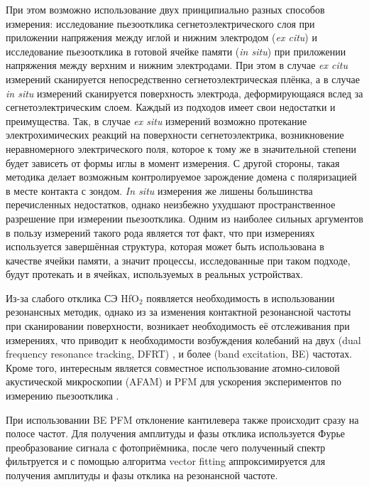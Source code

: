 При этом возможно использование двух принципиально разных способов измерения: исследование пьезоотклика сегнетоэлектрического слоя при приложении напряжения между иглой и нижним электродом (\textit{ex citu}) и исследование пьезоотклика в готовой ячейке памяти (\textit{in situ}) при приложении напряжения между верхним и нижним электродами. При этом в случае \textit{ex citu} измерений сканируется непосредственно сегнетоэлектрическая плёнка, а в случае \textit{in situ} измерений сканируется поверхность электрода, деформирующаяся вслед за сегнетоэлектрическим слоем. Каждый из подходов имеет свои недостатки и преимущества. Так, в случае \textit{ex situ} измерений возможно протекание электрохимических реакций на поверхности сегнетоэлектрика, возникновение неравномерного электрического поля, которое к тому же в значительной степени будет зависеть от формы иглы в момент измерения. С другой стороны, такая методика делает возможным контролируемое зарождение домена с поляризацией в месте контакта с зондом. \textit{In situ} измерения же лишены большинства перечисленных недостатков, однако неизбежно ухудшают пространственное разрешение при измерении пьезоотклика. Одним из наиболее сильных аргументов в пользу измерений такого рода является тот факт, что при измерениях используется завершённая структура, которая может быть использована в качестве ячейки памяти, а значит процессы, исследованные при таком подходе, будут протекать и в ячейках, используемых в реальных устройствах.

Из-за слабого отклика СЭ HfO\(_2\) появляется необходимость в использовании резонансных методик, однако из за изменения контактной резонансной частоты при сканировании поверхности, возникает необходимость её отслеживания при измерениях, что приводит к необходимости возбуждения колебаний на двух (dual frequency resonance tracking, DFRT) \cite{rodriguezDualfrequencyResonancetrackingAtomic2007}, и более (band excitation, BE) \cite{jesseBandExcitationMethod2007, jesseBandExcitationScanning2011} частотах. Кроме того, интересным является совместное использование атомно-силовой акустической микроскопии (AFAM) и PFM для ускорения экспериментов по измерению пьезоотклика \cite{spiridonovBandExcitationPiezoresponse2021}.

При использовании BE PFM отклонение кантилевера также происходит сразу на полосе частот. Для получения амплитуды и фазы отклика используется Фурье преобразование сигнала с фотоприёмника, после чего полученный спектр фильтруется и с помощью алгоритма vector fitting \cite{gustavsenRationalApproximationFrequency1999} аппроксимируется для получения амплитуды и фазы отклика на резонансной частоте.


